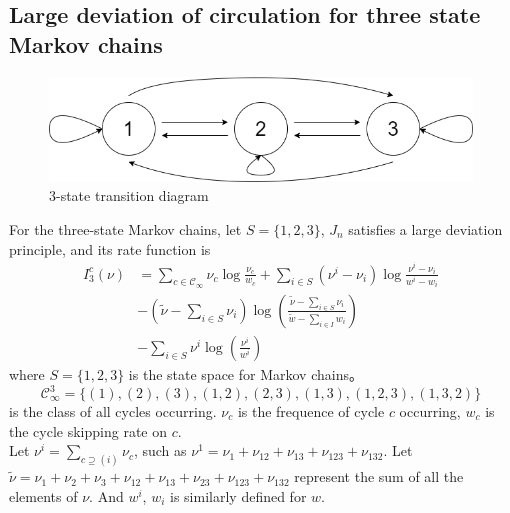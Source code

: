 \documentclass[11pt,en,cite=authoryear]{elegantpaper}
\begin{document}
\subsection{Large deviation of circulation for three state Markov chains}

\begin{theorem}
    \begin{figure}[h]
        \centering
        \includegraphics[scale=0.3]{3-state.png}
        \caption{3-state transition diagram}
    \end{figure}

For the three-state Markov chains, let $S = \{1, 2, 3\}$, $J_{n}$ satisfies a large deviation principle, and its rate function is
\begin{align}
    I_3^c(\nu) &= \sum_{c \in \mathcal{C}_{\infty}} \nu_{c} \log \frac{\nu_{c}}{w_c} + \sum_{i\in S}(\nu^i - \nu_i)\log \frac{\nu^i - \nu_i}{w^i - w_i} \\
    &-(\tilde{\nu} - \sum_{i\in S}\nu_i)\log(\frac{\tilde{\nu} - \sum_{i\in S}\nu_i}{\tilde{w} - \sum_{i\in I}w_i}) \\
    &-\sum_{i\in S} \nu^i \log (\frac{\nu^i}{w^i})
\end{align}
where $S=\{1, 2, 3\}$ is the state space for Markov chains。
$$\mathcal{C}_{\infty}^3 = \{(1), (2), (3), (1,2), (2,3), (1,3), (1,2,3), (1,3,2)\}$$
is the class of all cycles occurring.
$\nu_c$ is the frequence of cycle $c$ occurring, $w_c$ is the cycle skipping rate on $c$.\\
Let $\nu^{i} = \sum_{c \supseteq (i)} \nu_{c}$, such as $\nu^{1} = \nu_{1} + \nu_{12} + \nu_{13} + \nu_{123} +\nu_{132}$.
Let  $\tilde{\nu} = \nu_{1} + \nu_{2} + \nu_{3} + \nu_{12} + \nu_{13} + \nu_{23} + \nu_{123} +\nu_{132}$ represent the sum of all the elements of $\nu$. 
And $w^i$, $w_i$ is similarly defined for $w$.
\end{theorem}
\end{document}
